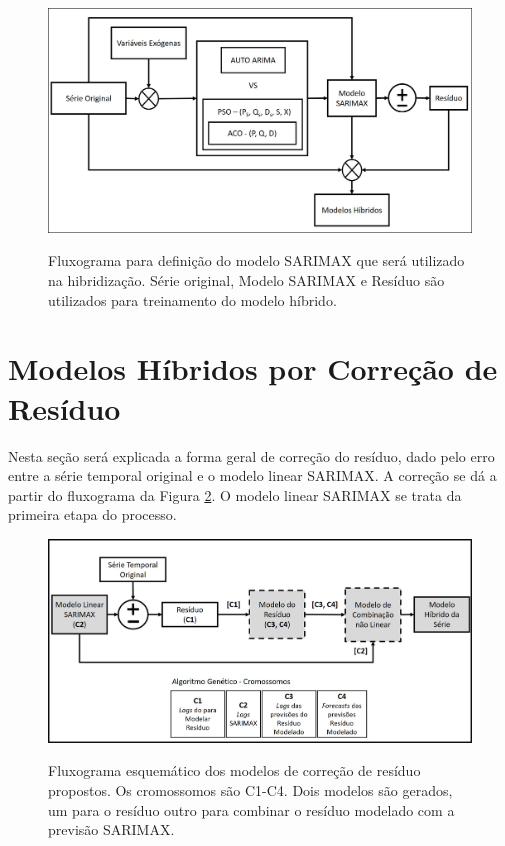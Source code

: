 \begin{figure}[!htbp]
    \centering
    \caption{Fluxograma para definição do modelo SARIMAX que será utilizado na hibridização. Série original, Modelo SARIMAX e Resíduo são utilizados para treinamento do modelo híbrido.}
    \includegraphics[width=\textwidth]{Figuras/mat_e_met/fluxograma_sarimax.jpg}
    \label{fig:cap3_fluxograma_sarimax}
\end{figure}

\section{Modelos Híbridos por Correção de Resíduo}
\label{subsec:modelos_hibridos}

Nesta seção será explicada a forma geral de correção do resíduo, dado pelo erro entre a série temporal original e o modelo linear SARIMAX. A correção se dá a partir do fluxograma da Figura \ref{fig:cap3_fluxograma_cromossomo}. O modelo linear SARIMAX se trata da primeira etapa do processo.

\begin{figure}[htbp]
    \centering
    \caption{Fluxograma esquemático dos modelos de correção de resíduo propostos. Os cromossomos são C1-C4. Dois modelos são gerados, um para o resíduo outro para combinar o resíduo modelado com a previsão SARIMAX.}
    \includegraphics[width=\textwidth]{Figuras/mat_e_met/fluxograma_cromossomos.jpg}
    \label{fig:cap3_fluxograma_cromossomo}
\end{figure}

